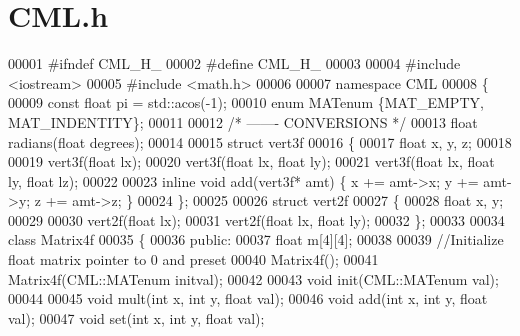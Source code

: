 \section{C\+M\+L.\+h}
\label{_c_m_l_8h_source}

\begin{DoxyCode}
00001 \textcolor{preprocessor}{#ifndef CML\_H\_}
00002 \textcolor{preprocessor}{#define CML\_H\_}
00003 
00004 \textcolor{preprocessor}{#include <iostream>}
00005 \textcolor{preprocessor}{#include <math.h>}
00006 
00007 \textcolor{keyword}{namespace }CML
00008 \{
00009     \textcolor{keyword}{const} \textcolor{keywordtype}{float} pi = std::acos(-1);
00010     \textcolor{keyword}{enum} MATenum \{MAT\_EMPTY, MAT\_INDENTITY\};
00011 
00012     \textcolor{comment}{/* ------- CONVERSIONS */}
00013     \textcolor{keywordtype}{float} radians(\textcolor{keywordtype}{float} degrees);
00014 
00015     \textcolor{keyword}{struct }vert3f
00016     \{
00017         \textcolor{keywordtype}{float} x, y, z;
00018 
00019         vert3f(\textcolor{keywordtype}{float} lx);
00020         vert3f(\textcolor{keywordtype}{float} lx, \textcolor{keywordtype}{float} ly);
00021         vert3f(\textcolor{keywordtype}{float} lx, \textcolor{keywordtype}{float} ly, \textcolor{keywordtype}{float} lz);
00022 
00023         \textcolor{keyword}{inline} \textcolor{keywordtype}{void} add(vert3f* amt) \{ x += amt->x; y += amt->y; z += amt->z; \}
00024     \};
00025 
00026     \textcolor{keyword}{struct }vert2f
00027     \{
00028         \textcolor{keywordtype}{float} x, y;
00029 
00030         vert2f(\textcolor{keywordtype}{float} lx);
00031         vert2f(\textcolor{keywordtype}{float} lx, \textcolor{keywordtype}{float} ly);
00032     \};
00033 
00034     \textcolor{keyword}{class }Matrix4f
00035     \{
00036     \textcolor{keyword}{public}:
00037         \textcolor{keywordtype}{float} m[4][4];
00038         
00039         \textcolor{comment}{//Initialize float matrix pointer to 0 and preset}
00040         Matrix4f();
00041         Matrix4f(CML::MATenum initval);
00042         
00043         \textcolor{keywordtype}{void}  init(CML::MATenum val);
00044 
00045         \textcolor{keywordtype}{void}  mult(\textcolor{keywordtype}{int} x, \textcolor{keywordtype}{int} y, \textcolor{keywordtype}{float} val);
00046         \textcolor{keywordtype}{void}  add(\textcolor{keywordtype}{int} x, \textcolor{keywordtype}{int} y, \textcolor{keywordtype}{float} val);
00047         \textcolor{keywordtype}{void}  \textcolor{keyword}{set}(\textcolor{keywordtype}{int} x, \textcolor{keywordtype}{int} y, \textcolor{keywordtype}{float} val);

\end{DoxyCode}
